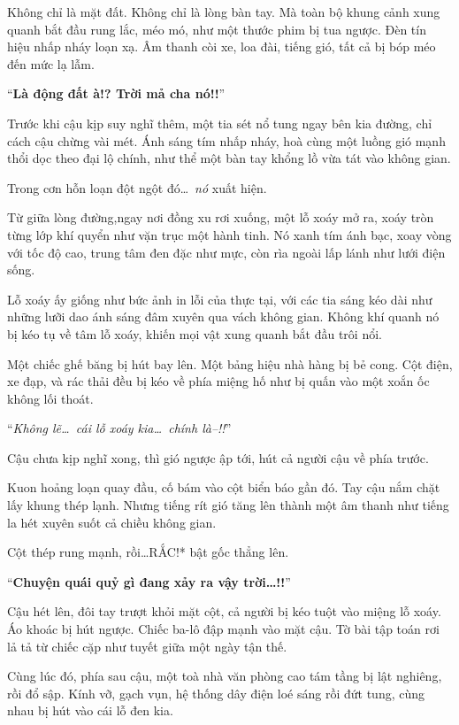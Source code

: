 \documentclass[../main.tex]{subfiles}
\begin{document}
Không chỉ là mặt đất. Không chỉ là lòng bàn tay. Mà toàn bộ khung cảnh xung quanh bắt đầu rung lắc, méo mó, như một thước phim bị tua ngược. Đèn tín hiệu nhấp nháy loạn xạ. Âm thanh còi xe, loa đài, tiếng gió, tất cả bị bóp méo đến mức lạ lẫm.

``\textbf{Là động đất à!? Trời mả cha nó!!}''

Trước khi cậu kịp suy nghĩ thêm, một tia sét nổ tung ngay bên kia đường, chỉ cách cậu chừng vài mét. Ánh sáng tím nhấp nháy, hoà cùng một luồng gió mạnh thổi dọc theo đại lộ chính, như thể một bàn tay khổng lồ vừa tát vào không gian.

Trong cơn hỗn loạn đột ngột đó\dots\ \emph{nó} xuất hiện.

Từ giữa lòng đường,ngay nơi đồng xu rơi xuống, một lỗ xoáy mở ra, xoáy tròn từng lớp khí quyển như vặn trục một hành tinh. Nó xanh tím ánh bạc, xoay vòng với tốc độ cao, trung tâm đen đặc như mực, còn rìa ngoài lấp lánh như lưới điện sống.

Lỗ xoáy ấy giống như bức ảnh in lỗi của thực tại, với các tia sáng kéo dài như những lưỡi dao ánh sáng đâm xuyên qua vách không gian. Không khí quanh nó bị kéo tụ về tâm lỗ xoáy, khiến mọi vật xung quanh bắt đầu trôi nổi.


Một chiếc ghế băng bị hút bay lên. Một bảng hiệu nhà hàng bị bẻ cong. Cột điện, xe đạp, và rác thải đều bị kéo về phía miệng hố như bị quấn vào một xoắn ốc không lối thoát.

``\textit{Không lẽ\dots\ cái lỗ xoáy kia\dots\ chính là--!!}''

Cậu chưa kịp nghĩ xong, thì gió ngược ập tới, hút cả người cậu về phía trước.

Kuon hoảng loạn quay đầu, cố bám vào cột biển báo gần đó. Tay cậu nắm chặt lấy khung thép lạnh. Nhưng tiếng rít gió tăng lên thành một âm thanh như tiếng la hét xuyên suốt cả chiều không gian.

Cột thép rung mạnh, rồi\dots *RẮC!* bật gốc thẳng lên.

``\textbf{Chuyện quái quỷ gì đang xảy ra vậy trời\dots!!}''

Cậu hét lên, đôi tay trượt khỏi mặt cột, cả người bị kéo tuột vào miệng lỗ xoáy. Áo khoác bị hút ngược. Chiếc ba-lô đập mạnh vào mặt cậu. Tờ bài tập toán rơi lả tả từ chiếc cặp như tuyết giữa một ngày tận thế.

Cùng lúc đó, phía sau cậu, một toà nhà văn phòng cao tám tầng bị lật nghiêng, rồi đổ sập. Kính vỡ, gạch vụn, hệ thống dây điện loé sáng rồi đứt tung, cùng nhau bị hút vào cái lỗ đen kia.
\end{document}
